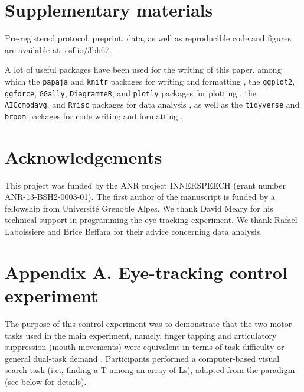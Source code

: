 \documentclass[12pt,]{book}
\begin{document}
\hypertarget{supp}{\section*{Supplementary materials}\label{supp}}

Pre-registered protocol, preprint, data, as well as reproducible code
and figures are available at: \href{http://osf.io/3bh67}{osf.io/3bh67}.

A lot of useful packages have been used for the writing of this paper,
among which the \texttt{papaja} and \texttt{knitr} packages for writing
and formatting \citep{R-papaja, R-knitr}, the \texttt{ggplot2},
\texttt{ggforce}, \texttt{GGally}, \texttt{DiagrammeR}, and
\texttt{plotly} packages for plotting
\citep{R-ggplot2, R-ggforce, R-GGally, R-DiagrammeR, R-plotly}, the
\texttt{AICcmodavg}, and \texttt{Rmisc} packages for data analysis
\citep{R-AICcmodavg, R-Rmisc}, as well as the \texttt{tidyverse} and
\texttt{broom} packages for code writing and formatting
\citep{R-broom, R-tidyverse}.

\section*{Acknowledgements}\label{acknowledgements}

This project was funded by the ANR project INNERSPEECH (grant number
ANR-13-BSH2-0003-01). The first author of the manuscript is funded by a
fellowship from Université Grenoble Alpes. We thank David Meary for his
technical support in programming the eye-tracking experiment. We thank
Rafael Laboissiere and Brice Beffara for their advice concerning data
analysis.

\section*{Appendix A. Eye-tracking control
experiment}\label{appendix-a.-eye-tracking-control-experiment}

The purpose of this control experiment was to demonstrate that the two
motor tasks used in the main experiment, namely, finger tapping and
articulatory suppression (mouth movements) were equivalent in terms of
task difficulty or general dual-task demand \citep{Emerson2003}.
Participants performed a computer-based visual search task (i.e.,
finding a T among an array of Ls), adapted from the \citet{Treisman1980}
paradigm (see below for details).
\end{document}
